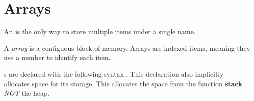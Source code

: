 \section{Arrays}\label{sec:Arrays}
An  is the only way to store multiple items under a single name.

\begin{definition}[Array]\label{def:Array}
  A \emph{array} is a contiguous block of memory.
  Arrays are indexed items, meaning they use a number to identify each item.
\end{definition}

s are declared with the following syntax .
This declaration also implicitly allocates space for its storage.
This allocates the space from the function \textbf{stack} \textit{NOT} the heap.


